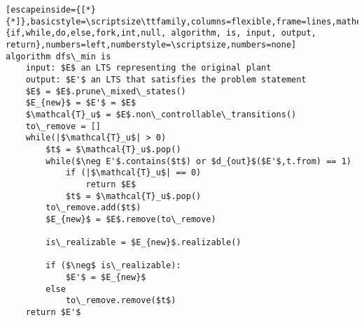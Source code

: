 \renewcommand{\ttdefault}{pcr}
\begin{lstlisting}[escapeinside={[*}{*]},basicstyle=\scriptsize\ttfamily,columns=flexible,frame=lines,mathescape=true,keywordstyle=\textbf,morekeywords={if,while,do,else,fork,int,null, algorithm, is, input, output, return},numbers=left,numberstyle=\scriptsize,numbers=none]
algorithm dfs\_min is
	input: $E$ an LTS representing the original plant
	output: $E'$ an LTS that satisfies the problem statement
	$E$ = $E$.prune\_mixed\_states()
	$E_{new}$ = $E'$ = $E$ 
	$\mathcal{T}_u$ = $E$.non\_controllable\_transitions()
	to\_remove = []
	while(|$\mathcal{T}_u$| > 0)
		$t$ = $\mathcal{T}_u$.pop()
		while($\neg E'$.contains($t$) or $d_{out}$($E'$,t.from) == 1)
			if (|$\mathcal{T}_u$| == 0)
				return $E$
			$t$ = $\mathcal{T}_u$.pop() 
		to\_remove.add($t$)
		$E_{new}$ = $E$.remove(to\_remove)
		
		is\_realizable = $E_{new}$.realizable()
		
		if ($\neg$ is\_realizable):
			$E'$ = $E_{new}$
		else
			to\_remove.remove($t$)
	return $E'$  
\end{lstlisting}